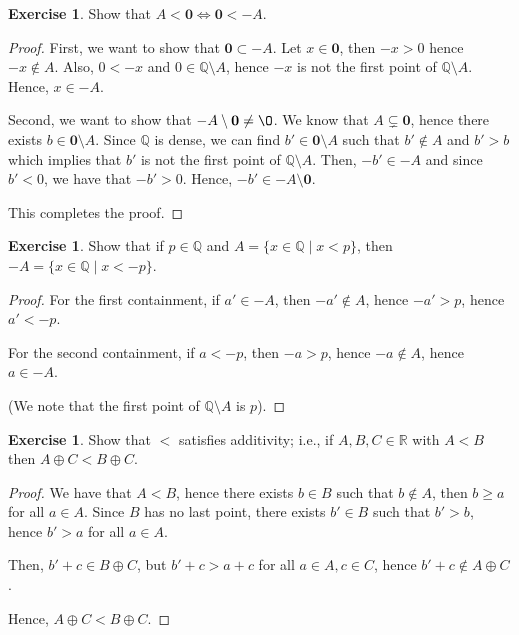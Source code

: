 \documentclass[11pt]{article}
\newcommand{\bbQ}{\mathbb{Q}}
\newcommand{\bbR}{\mathbb{R}}
\renewcommand{\emptyset}{\O}
\theoremstyle{definition}
\newtheorem{exercise}[theorem]{Exercise}
\numberwithin{equation}{subsection}
\begin{document}
\begin{exercise}
	Show that $A < \mathbf{0} \Longleftrightarrow \mathbf{0} < -A$.
        
\begin{proof}
First, we want to show that $\mathbf{0} \subset -A$. Let $x \in \mathbf{0}$, then $-x>0$ hence $-x \notin A$. Also, $0<-x$ and $0\in \bbQ \setminus A$, hence $-x$ is not the first point of $\bbQ \setminus A$. Hence, $x \in -A$. 


Second, we want to show that $-A \setminus \mathbf{0} \neq \emptyset$. We know that $A \subsetneq \mathbf{0}$, hence there exists $b \in \mathbf{0} \setminus A$. Since $\bbQ$ is dense, we can find $b' \in \mathbf{0} \setminus A$ such that $b' \notin A$ and $b'>b$ which implies that $b'$ is not the first point of $\bbQ \setminus A$. Then, $-b' \in -A$ and since $b'<0$, we have that $-b' > 0$. Hence, $-b' \in -A \setminus \mathbf{0}$. 

This completes the proof.

\renewcommand\qedsymbol{QED}
\end{proof}
\end{exercise}

\begin{exercise}
	Show that if $p\in\bbQ$ and $A=\{x\in\bbQ\mid x<p\}$, then $-A=\{x\in\bbQ\mid x<-p\}$.
        
\begin{proof}
For the first containment, if $a' \in -A$, then $-a'\notin A$, hence $-a'>p$, hence $a'<-p$.

For the second containment, if $a<-p$, then $-a>p$, hence $-a \notin A$, hence $a \in -A$.

(We note that the first point of $\bbQ \setminus A$ is $p$).

\renewcommand\qedsymbol{QED}
\end{proof}
\end{exercise}



\begin{exercise}
	Show that $<$ satisfies additivity; i.e., if  $A,B,C\in\bbR$ with $A<B$ then $A\oplus C<B\oplus C$. 
        
\begin{proof}
We have that $A<B$, hence there exists $b \in B$ such that $b \notin A$, then $b\geq a$ for all $a \in A$. Since $B$ has no last point, there exists $b' \in B$ such that $b'>b$, hence $b'>a$ for all $a \in A$.

Then, $b'+c\in B \oplus C$, but $b'+c>a+c$ for all $a \in A, c \in C$, hence $b'+c \notin A \oplus C$.

Hence, $A \oplus C < B \oplus C$.

\renewcommand\qedsymbol{QED}
\end{proof}
\end{exercise}
\end{document}
